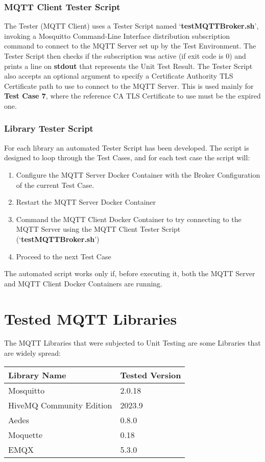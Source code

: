 \documentclass[binding=0.6cm,noexaminfo]{sapthesis}
\begin{document}
\subsection{MQTT Client Tester Script}

The Tester (MQTT Client) uses a Tester Script named `\textbf{testMQTTBroker.sh}', invoking a Mosquitto Command-Line Interface distribution subscription command to connect to the MQTT Server set up by the Test Environment. The Tester Script then checks if the subscription was active (if exit code is 0) and prints a line on \textbf{stdout} that represents the Unit Test Result.
The Tester Script also accepts an optional argument to specify a Certificate Authority TLS Certificate path to use to connect to the MQTT Server. This is used mainly for \textbf{Test Case 7}, where the reference CA TLS Certificate to use must be the expired one.
\subsection{Library Tester Script}

For each library an automated Tester Script has been developed. The script is designed to loop through the Test Cases, and for each test case the script will:
\begin{enumerate}
	\item Configure the MQTT Server Docker Container with the Broker Configuration of the current Test Case.
	\item Restart the MQTT Server Docker Container
	\item Command the MQTT Client Docker Container to try connecting to the MQTT Server using the MQTT Client Tester Script (`\textbf{testMQTTBroker.sh}')
	\item Proceed to the next Test Case
\end{enumerate}
The automated script works only if, before executing it, both the MQTT Server and MQTT Client Docker Containers are running.

\chapter{Tested MQTT Libraries}
The MQTT Libraries that were subjected to Unit Testing are some Libraries that are widely spread:

\begin{center}
\begin{tabular}{| p{6cm} | p{6cm} |}
\hline
\textbf{Library Name} & \textbf{Tested Version} \\
\hline
Mosquitto & 2.0.18 \\
\hline
HiveMQ Community Edition & 2023.9 \\
\hline
Aedes & 0.8.0 \\
\hline
Moquette & 0.18 \\
\hline
EMQX & 5.3.0 \\
\hline
\end{tabular}
\end{center}
\end{document}
